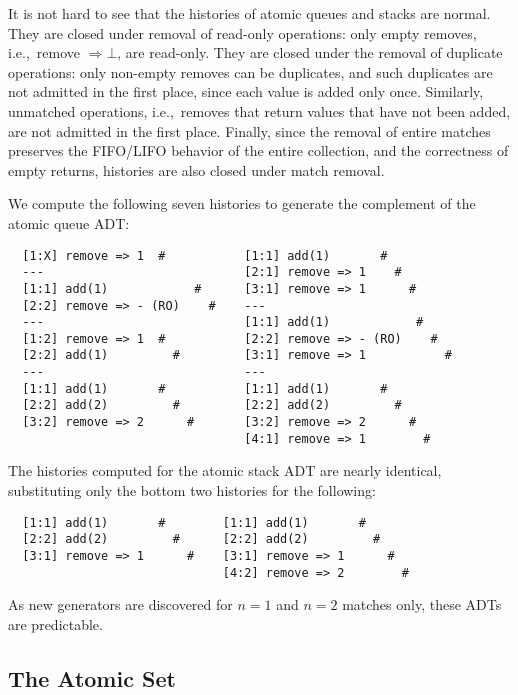 It is not hard to see that the histories of atomic queues and stacks are
normal. They are closed under removal of read-only operations: only empty
removes, i.e.,~remove $\Rightarrow \mathord\perp$, are read-only. They are
closed under the removal of duplicate operations: only non-empty removes can be
duplicates, and such duplicates are not admitted in the first place, since each
value is added only once. Similarly, unmatched operations, i.e.,~removes that
return values that have not been added, are not admitted in the first place.
Finally, since the removal of entire matches preserves the FIFO/LIFO behavior
of the entire collection, and the correctness of empty returns, histories are
also closed under match removal.

We compute the following seven histories to generate the complement of the
atomic queue ADT:
\begin{verbatim}
  [1:X] remove => 1  #           [1:1] add(1)       #
  ---                            [2:1] remove => 1    #
  [1:1] add(1)            #      [3:1] remove => 1      #
  [2:2] remove => - (RO)    #    ---
  ---                            [1:1] add(1)            #
  [1:2] remove => 1  #           [2:2] remove => - (RO)    #
  [2:2] add(1)         #         [3:1] remove => 1           #
  ---                            ---
  [1:1] add(1)       #           [1:1] add(1)       #
  [2:2] add(2)         #         [2:2] add(2)         #
  [3:2] remove => 2      #       [3:2] remove => 2      #
                                 [4:1] remove => 1        #
\end{verbatim}
The histories computed for the atomic stack ADT are nearly identical,
substituting only the bottom two histories for the following:
\begin{verbatim}
  [1:1] add(1)       #        [1:1] add(1)       #
  [2:2] add(2)         #      [2:2] add(2)         #
  [3:1] remove => 1      #    [3:1] remove => 1      #
                              [4:2] remove => 2        #
\end{verbatim}
As new generators are discovered for $n=1$ and $n=2$ matches only, these ADTs
are predictable.

\subsection{The Atomic Set}

